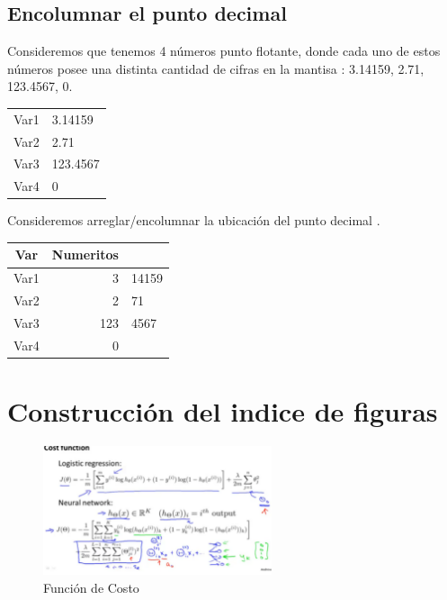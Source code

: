 \documentclass{article}
\begin{document}
\subsection{Encolumnar el punto decimal}
Consideremos que tenemos 4 números punto flotante, donde cada uno de estos números posee una distinta cantidad de cifras en la mantisa : 3.14159, 2.71, 123.4567, 0. 

\begin{center}
	\begin{tabular}{cl}
		\hline
		Var1 & 3.14159\\
		Var2 & 2.71\\
		Var3 & 123.4567\\
		Var4 & 0\\
		\hline
	\end{tabular}
\end{center}

Consideremos arreglar/encolumnar la ubicación del punto decimal . 

\begin{center}
	\begin{tabular}{cr@{.}l}
		Var & Numeritos & \\
		\hline
		Var1 & 3&14159\\
		Var2 & 2&71\\
		Var3 & 123&4567\\
		Var4 & 0&\\
		\hline
	\end{tabular}
\end{center}

\section{Construcción del indice de figuras}
\lipsum[2-5]

\begin{figure}[h]
	\centering
	\includegraphics[width=0.6\textwidth]{Figuras/deepma.jpg}
	\caption{Función de Costo}
	\label{fig: Costo}
\end{figure}
\lipsum[1-9]
\end{document}
